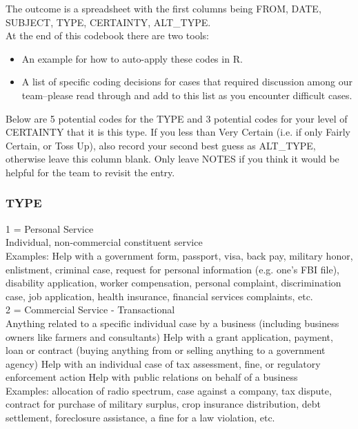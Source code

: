 \documentclass{article}
\begin{document}
The outcome is a spreadsheet with the first columns being FROM, DATE, SUBJECT, TYPE, CERTAINTY, ALT\_TYPE.\\

At the end of this codebook there are two tools:
\begin{itemize}
\item[1)] An example for how to auto-apply these codes in R. 
\item[2)] A list of specific coding decisions for cases that required discussion among our team--please read through and add to this list as you encounter difficult cases. 
\end{itemize}

Below are 5 potential codes for the TYPE and 3 potential codes for your level of CERTAINTY that it is this type. If you less than Very Certain (i.e. if only Fairly Certain, or Toss Up), also record your second best guess as ALT\_TYPE, otherwise leave this column blank. Only leave NOTES if you think it would be helpful for the team to revisit the entry.

\subsubsection{TYPE}
1 = Personal Service\\
Individual, non-commercial constituent service\\
Examples: Help with a government form, passport, visa, back pay, military honor, enlistment, criminal case, request for personal information (e.g. one’s FBI file), disability application, worker compensation, personal complaint, discrimination case, job application, health insurance, financial services complaints, etc.\\


2 = Commercial Service - Transactional \\
Anything related to a specific individual case by a business (including business owners like farmers and consultants)
Help with a grant application, payment, loan or contract (buying anything from or selling anything to a government agency) 
Help with an individual case of tax assessment, fine, or regulatory enforcement action
Help with public relations on behalf of a business\\
Examples: allocation of radio spectrum, case against a company, tax dispute, contract for purchase of military surplus, crop insurance distribution, debt settlement, foreclosure assistance, a fine for a law violation, etc. \\
\end{document}
